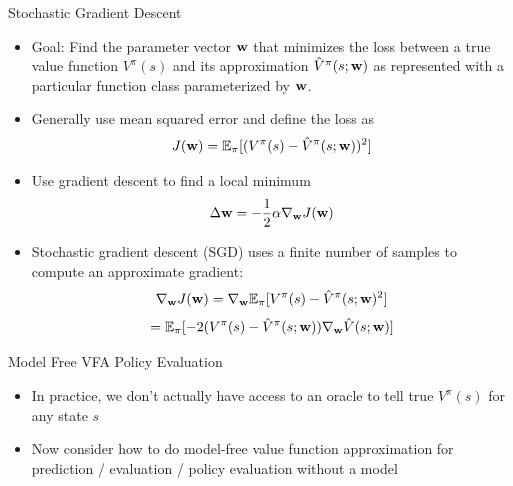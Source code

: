 \documentclass[aspectratio=169]{../latex_main/tntbeamer}  %
\begin{document}
\begin{frame}[c]{Stochastic Gradient Descent}
	
	
	\begin{itemize}
		\item Goal: Find the parameter vector $\mathbf{w}$ that minimizes the loss between a
		true value function $V^{\pi}(s)$ and its approximation $\hat{V}^\pi(s; \mathbf{w})$ as
		represented with a particular function class parameterized by $\mathbf{w}$.
		\item Generally use mean squared error and define the loss as 
		$$ J(\mathbf{w}) = \mathbb{E}_{\pi} [(V^\pi(s) - \hat{V}^\pi(s;\mathbf{w}))^2]$$
		\item Use gradient descent to find a local minimum 
		$$ \Delta \mathbf{w} = - \frac{1}{2} \alpha \nabla_{\mathbf{w}} J(\mathbf{w})$$
		\item Stochastic gradient descent (SGD) uses a finite number of samples to compute an approximate gradient:
		$$ \nabla_{\mathbf{w}} J(\mathbf{w}) = \nabla_{\mathbf{w}} \mathbb{E}_{\pi}[V^\pi (s) - \hat{V}^\pi (s; \mathbf{w})^2]$$
		$$= \mathbb{E}_\pi [-2 (V^\pi(s) - \hat{V}^\pi (s;\mathbf{w})) \nabla_{\mathbf{w}} \hat{V}(s;\mathbf{w})]$$
	\end{itemize}
	
\end{frame}
\begin{frame}[c]{Model Free VFA Policy Evaluation}
	
	
	\begin{itemize}
		\item In practice, we don’t actually have access to an oracle to tell true $V^\pi(s)$ for any
		state $s$
		\item Now consider how to do model-free value function approximation for
		prediction / evaluation / policy evaluation without a model
	\end{itemize}
	
\end{frame}
\end{document}
